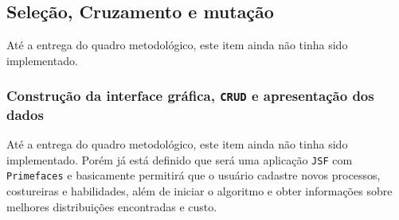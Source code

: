 \subsection{Seleção, Cruzamento e mutação}
 \par Até a entrega do quadro metodológico, este item ainda não tinha sido implementado.
 
\subsubsection{Construção da interface gráfica, \texttt{CRUD} e apresentação dos dados}
\par Até a entrega do quadro metodológico, este item ainda não tinha sido implementado.
Porém já está definido que será uma aplicação \texttt{JSF} com \texttt{Primefaces} e 
basicamente permitirá que o usuário cadastre novos processos, costureiras e habilidades,
além de iniciar o algoritmo e obter informações sobre melhores distribuições encontradas
e custo. 



% 
% 
% 
%    	
% 
% 
%   
% 
%  
